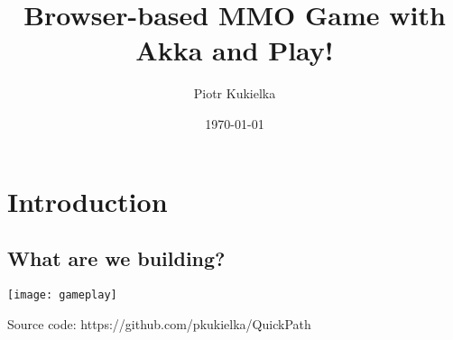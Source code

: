 \documentclass{beamer}
\title{Browser-based MMO Game with Akka and Play!}
\author{Piotr Kukielka}
\date{\today}
\begin{document}
\begin{frame}
	\titlepage
\end{frame}

\begin{center}
	\tableofcontents
\end{center}

\section{Introduction}
	\subsection{What are we building?}
		\begin{frame}
			\begin{center}
					\texttt{[image: gameplay]}

					Source code: https://github.com/pkukielka/QuickPath
			\end{center}
		\end{frame}
\end{document}
